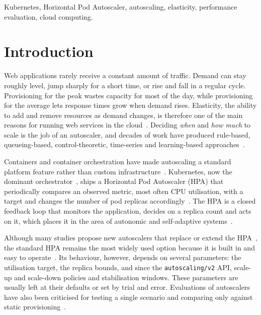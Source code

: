 \documentclass[conference,a4paper]{IEEEtran}
\begin{document}
\begin{IEEEkeywords}
Kubernetes, Horizontal Pod Autoscaler, autoscaling, elasticity, performance
evaluation, cloud computing.
\end{IEEEkeywords}

\section{Introduction}

Web applications rarely receive a constant amount of traffic. Demand can stay
roughly level, jump sharply for a short time, or rise and fall in a regular
cycle. Provisioning for the peak wastes capacity for most of the day, while
provisioning for the average lets response times grow when demand rises.
Elasticity, the ability to add and remove resources as demand changes, is
therefore one of the main reasons for running web services in the
cloud~\cite{aldhuraibi2018elasticity,qu2019autoscaling}. Deciding \emph{when}
and \emph{how much} to scale is the job of an autoscaler, and decades of work
have produced rule-based, queueing-based, control-theoretic, time-series and
learning-based
approaches~\cite{loridobotran2014a,qu2019autoscaling,chen2019a,gari2021reinforcement}.

Containers and container orchestration have made autoscaling a standard
platform feature rather than custom
infrastructure~\cite{bernstein2014containers,pahl2019cloud,burns2016borg}.
Kubernetes, now the dominant orchestrator~\cite{truyen2019a,carrion2023kubernetes},
ships a Horizontal Pod Autoscaler (HPA) that periodically compares an observed
metric, most often CPU utilisation, with a target and changes the number of
pod replicas accordingly~\cite{nguyen2020horizontal}. The HPA is a closed
feedback loop that monitors the application, decides on a replica count and
acts on it, which places it in the area of autonomic and self-adaptive
systems~\cite{kephart2003the,salehie2009selfadaptive}.

Although many studies propose new autoscalers that replace or extend the
HPA~\cite{dangquang2021deep,imdoukh2020machine,toka2021machine,phuc2022trafficaware,abdelkhaleq2023intelligent},
the standard HPA remains the most widely used option because it is built in
and easy to operate~\cite{pozdniakova2024slaadaptive}. Its behaviour, however,
depends on several parameters: the utilisation target, the replica bounds, and
since the \texttt{autoscaling/v2} API, scale-up and scale-down policies and
stabilisation windows. These parameters are usually left at their defaults or
set by trial and error. Evaluations of autoscalers have also been criticised
for testing a single scenario and comparing only against static
provisioning~\cite{ilyushkin2018an,papadopoulos2016peas}.
\end{document}
